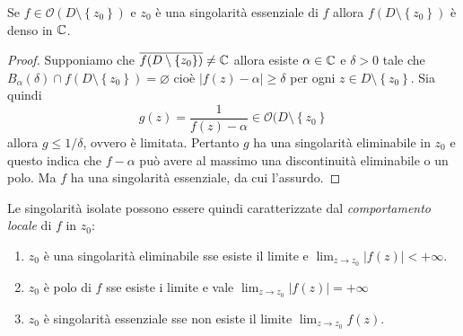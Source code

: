 \begin{theorem}
    Se $f \in \mathcal{O}(D \setminus \left\{z_0  \right\})$ e $z_0$ è una
    singolarità essenziale di $f$ allora $f(D \setminus \left\{ z_0 \right\})$
    è denso in $\mathbb{C}$.
  \label{thr:casorati_weierstrass}
\end{theorem}
\begin{proof}
  Supponiamo che $\overline{f(D \setminus \left\{ z_0 \right\})} \neq \mathbb{C}$ allora
  esiste $\alpha \in \mathbb{C}$ e $\delta > 0$ tale che $B_{\alpha}(\delta) \cap f(D
  \setminus \left\{ z_0 \right\}) = \varnothing$ cioè $|f(z) - \alpha| \ge
  \delta$ per ogni $z \in D \setminus \left\{ z_0 \right\}$. Sia quindi
  \begin{equation*}
    g(z) = \frac{1}{f(z) - \alpha} \in \mathcal{O}(D \setminus \left\{ z_0
      \right\}
  \end{equation*}
  allora $g \le 1/\delta$, ovvero è limitata. Pertanto $g$ ha una singolarità
  eliminabile in $z_0$ e questo indica che $f - \alpha$ può avere al massimo una
  discontinuità eliminabile o un polo. Ma $f$ ha una singolarità essenziale, da
  cui l'assurdo.
\end{proof}


\begin{remark}
  Le singolarità isolate possono essere quindi caratterizzate dal
  \emph{comportamento locale} di $f$ in $z_0$: 
  \begin{enumerate}
    \item $z_0$ è una singolarità eliminabile sse esiste il limite e 
      $\lim_{z \to z_0} |f(z)| < +\infty$.
    \item $z_0$ è polo di $f$ sse esiste i limite e vale $\lim_{z\to
      z_0}|f(z)| = +\infty$
    \item $z_0$ è singolarità essenziale sse non esiste il limite
      $\lim_{z \to z_0} f(z)$. 
  \end{enumerate}
  \label{rmk:comportamento_locale_singolarita}
\end{remark}
